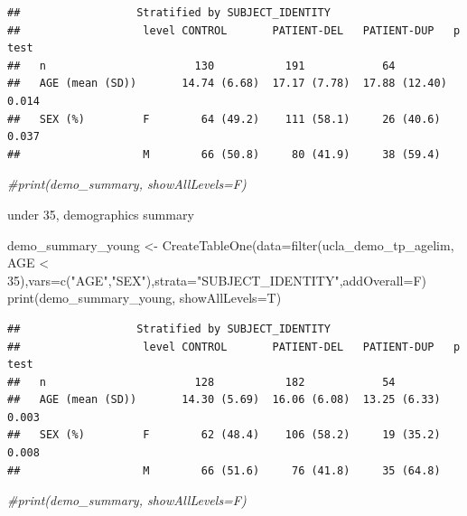 \documentclass[
]{article}
\newenvironment{Shaded}{\begin{snugshade}}{\end{snugshade}}
\newcommand{\AttributeTok}[1]{\textcolor[rgb]{0.77,0.63,0.00}{#1}}
\newcommand{\CommentTok}[1]{\textcolor[rgb]{0.56,0.35,0.01}{\textit{#1}}}
\newcommand{\DecValTok}[1]{\textcolor[rgb]{0.00,0.00,0.81}{#1}}
\newcommand{\FunctionTok}[1]{\textcolor[rgb]{0.00,0.00,0.00}{#1}}
\newcommand{\NormalTok}[1]{#1}
\newcommand{\OtherTok}[1]{\textcolor[rgb]{0.56,0.35,0.01}{#1}}
\newcommand{\SpecialCharTok}[1]{\textcolor[rgb]{0.00,0.00,0.00}{#1}}
\newcommand{\StringTok}[1]{\textcolor[rgb]{0.31,0.60,0.02}{#1}}
\begin{document}
\begin{verbatim}
##                  Stratified by SUBJECT_IDENTITY
##                   level CONTROL       PATIENT-DEL   PATIENT-DUP   p      test
##   n                       130           191            64                    
##   AGE (mean (SD))       14.74 (6.68)  17.17 (7.78)  17.88 (12.40)  0.014     
##   SEX (%)         F        64 (49.2)    111 (58.1)     26 (40.6)   0.037     
##                   M        66 (50.8)     80 (41.9)     38 (59.4)
\end{verbatim}

\begin{Shaded}
\begin{Highlighting}[]
\CommentTok{\#print(demo\_summary, showAllLevels=F)}
\end{Highlighting}
\end{Shaded}

under 35, demographics summary

\begin{Shaded}
\begin{Highlighting}[]
\NormalTok{demo\_summary\_young }\OtherTok{\textless{}{-}} \FunctionTok{CreateTableOne}\NormalTok{(}\AttributeTok{data=}\FunctionTok{filter}\NormalTok{(ucla\_demo\_tp\_agelim, AGE }\SpecialCharTok{\textless{}} \DecValTok{35}\NormalTok{),}\AttributeTok{vars=}\FunctionTok{c}\NormalTok{(}\StringTok{"AGE"}\NormalTok{,}\StringTok{"SEX"}\NormalTok{),}\AttributeTok{strata=}\StringTok{"SUBJECT\_IDENTITY"}\NormalTok{,}\AttributeTok{addOverall=}\NormalTok{F)}
\FunctionTok{print}\NormalTok{(demo\_summary\_young, }\AttributeTok{showAllLevels=}\NormalTok{T)}
\end{Highlighting}
\end{Shaded}

\begin{verbatim}
##                  Stratified by SUBJECT_IDENTITY
##                   level CONTROL       PATIENT-DEL   PATIENT-DUP   p      test
##   n                       128           182            54                    
##   AGE (mean (SD))       14.30 (5.69)  16.06 (6.08)  13.25 (6.33)   0.003     
##   SEX (%)         F        62 (48.4)    106 (58.2)     19 (35.2)   0.008     
##                   M        66 (51.6)     76 (41.8)     35 (64.8)
\end{verbatim}

\begin{Shaded}
\begin{Highlighting}[]
\CommentTok{\#print(demo\_summary, showAllLevels=F)}
\end{Highlighting}
\end{Shaded}
\end{document}

